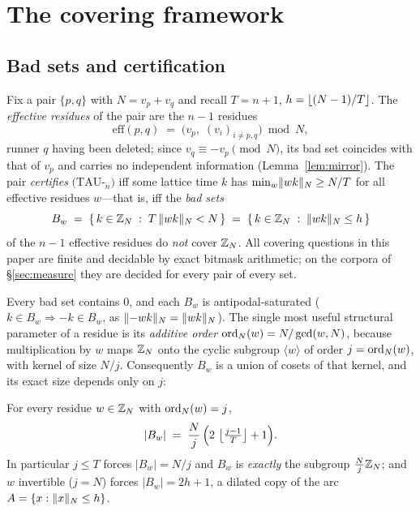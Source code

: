
\section{The covering framework}\label{sec:covering}

\subsection{Bad sets and certification}

Fix a pair $\{p,q\}$ with $N=v_p+v_q$ and recall
$T=n+1$, $h=\left\lfloor (N-1)/T \right\rfloor$. The \emph{effective residues} of the pair are
the $n-1$ residues
\[
\mathrm{eff}(p,q)\;=\;\bigl(v_p,\; (v_i)_{i\ne p,q}\bigr)\bmod N ,
\]
runner $q$ having been deleted; since $v_q\equiv -v_p\pmod N$, its bad set
coincides with that of $v_p$ and carries no independent information
(Lemma~\ref{lem:mirror}). The pair \emph{certifies} $(\mathrm{TAU}$-$_n)$
iff some lattice time $k$ has
$\min_w \lVert wk \rVert_{N}\ge N/T$ for all effective residues $w$---that is, iff the
\emph{bad sets}
\[
B_w\;=\;\{\,k\in\mathbb{Z}_N \;:\; T\,\lVert wk \rVert_{N}<N\,\}
     \;=\;\{\,k\in\mathbb{Z}_N \;:\; \lVert wk \rVert_{N}\le h\,\}
\]
of the $n-1$ effective residues do \emph{not} cover $\mathbb{Z}_N$. All covering
questions in this paper are finite and decidable by exact bitmask
arithmetic; on the corpora of \S\ref{sec:measure} they are decided for
every pair of every set.

Every bad set contains $0$, and each $B_w$ is antipodal-saturated
($k\in B_w\Rightarrow -k\in B_w$, as $\lVert -wk \rVert_{N}=\lVert wk \rVert_{N}$). The single most
useful structural parameter of a residue is its \emph{additive order}
$\operatorname{ord}_N(w)=N/\gcd(w,N)$, because multiplication by $w$ maps $\mathbb{Z}_N$ onto
the cyclic subgroup $\langle w\rangle$ of order $j=\operatorname{ord}_N(w)$, with kernel
of size $N/j$. Consequently $B_w$ is a union of cosets of that kernel, and
its exact size depends only on $j$:

\begin{lemma}\label{lem:size}
For every residue $w\in\mathbb{Z}_N$ with $\operatorname{ord}_N(w)=j$,
\[
|B_w|\;=\;\frac{N}{j}\,\Bigl(2\,\left\lfloor \tfrac{j-1}{T} \right\rfloor+1\Bigr).
\]
In particular $j\le T$ forces $|B_w|=N/j$ and $B_w$ is \emph{exactly} the
subgroup $\tfrac{N}{j}\mathbb{Z}_N$; and $w$ invertible ($j=N$) forces
$|B_w|=2h+1$, a dilated copy of the arc $A=\{x:\lVert x \rVert_{N}\le h\}$.
\end{lemma}

